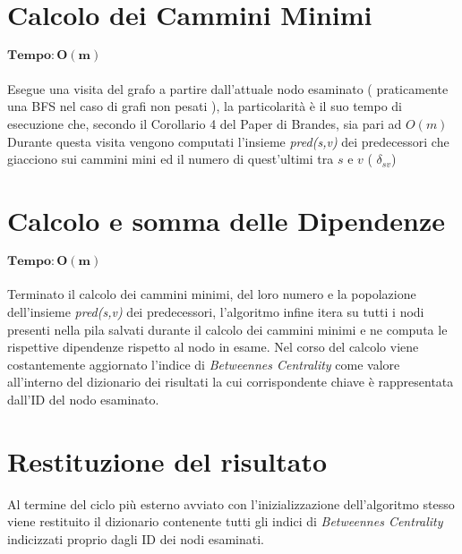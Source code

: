 \section{Calcolo dei Cammini Minimi}
$\mathbf{Tempo: O(m)}$\\ 	\\
Esegue una visita del grafo a partire dall'attuale nodo esaminato ( praticamente una BFS nel caso di grafi non pesati ), la particolarità è il suo tempo di esecuzione che, secondo il Corollario 4 del Paper di Brandes, sia pari ad $O(m)$
Durante questa visita vengono computati l'insieme \emph{pred(s,v)} dei predecessori che giacciono sui cammini mini ed il numero di quest'ultimi tra $s$ e $v$ ( $\delta_{sv}$)

\section{Calcolo e somma delle Dipendenze}
$\mathbf{Tempo: O(m)}$\\ 	\\
Terminato il calcolo dei cammini minimi, del loro numero e la popolazione dell'insieme \emph{pred(s,v)} dei predecessori,  l'algoritmo infine itera su tutti i nodi presenti nella pila salvati durante il calcolo dei cammini minimi e ne computa le rispettive dipendenze rispetto al nodo in esame. Nel corso del calcolo viene costantemente aggiornato l'indice di \emph{Betweennes Centrality} come valore all'interno del dizionario dei risultati la cui corrispondente chiave è rappresentata dall'ID del nodo esaminato.

\section{Restituzione del risultato}
Al termine del ciclo più esterno avviato con l'inizializzazione dell'algoritmo stesso viene restituito il dizionario contenente tutti gli indici di \emph{Betweennes Centrality} indicizzati proprio dagli ID dei nodi esaminati.

